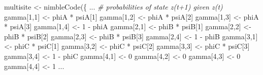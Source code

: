 \documentclass[
  12pt,
]{krantz}
\newenvironment{Shaded}{\begin{snugshade}}{\end{snugshade}}
\newcommand{\CommentTok}[1]{\textcolor[rgb]{0.56,0.35,0.01}{\textit{#1}}}
\newcommand{\DecValTok}[1]{\textcolor[rgb]{0.00,0.00,0.81}{#1}}
\newcommand{\FunctionTok}[1]{\textcolor[rgb]{0.00,0.00,0.00}{#1}}
\newcommand{\NormalTok}[1]{#1}
\newcommand{\OtherTok}[1]{\textcolor[rgb]{0.56,0.35,0.01}{#1}}
\newcommand{\SpecialCharTok}[1]{\textcolor[rgb]{0.00,0.00,0.00}{#1}}
\begin{document}
\begin{Shaded}
\begin{Highlighting}[]
\NormalTok{multisite }\OtherTok{\textless{}{-}} \FunctionTok{nimbleCode}\NormalTok{(\{}
\NormalTok{...}
  \CommentTok{\# probabilities of state z(t+1) given z(t)}
\NormalTok{  gamma[}\DecValTok{1}\NormalTok{,}\DecValTok{1}\NormalTok{] }\OtherTok{\textless{}{-}}\NormalTok{ phiA }\SpecialCharTok{*}\NormalTok{ psiA[}\DecValTok{1}\NormalTok{]}
\NormalTok{  gamma[}\DecValTok{1}\NormalTok{,}\DecValTok{2}\NormalTok{] }\OtherTok{\textless{}{-}}\NormalTok{ phiA }\SpecialCharTok{*}\NormalTok{ psiA[}\DecValTok{2}\NormalTok{]}
\NormalTok{  gamma[}\DecValTok{1}\NormalTok{,}\DecValTok{3}\NormalTok{] }\OtherTok{\textless{}{-}}\NormalTok{ phiA }\SpecialCharTok{*}\NormalTok{ psiA[}\DecValTok{3}\NormalTok{]}
\NormalTok{  gamma[}\DecValTok{1}\NormalTok{,}\DecValTok{4}\NormalTok{] }\OtherTok{\textless{}{-}} \DecValTok{1} \SpecialCharTok{{-}}\NormalTok{ phiA}
\NormalTok{  gamma[}\DecValTok{2}\NormalTok{,}\DecValTok{1}\NormalTok{] }\OtherTok{\textless{}{-}}\NormalTok{ phiB }\SpecialCharTok{*}\NormalTok{ psiB[}\DecValTok{1}\NormalTok{]}
\NormalTok{  gamma[}\DecValTok{2}\NormalTok{,}\DecValTok{2}\NormalTok{] }\OtherTok{\textless{}{-}}\NormalTok{ phiB }\SpecialCharTok{*}\NormalTok{ psiB[}\DecValTok{2}\NormalTok{]}
\NormalTok{  gamma[}\DecValTok{2}\NormalTok{,}\DecValTok{3}\NormalTok{] }\OtherTok{\textless{}{-}}\NormalTok{ phiB }\SpecialCharTok{*}\NormalTok{ psiB[}\DecValTok{3}\NormalTok{]}
\NormalTok{  gamma[}\DecValTok{2}\NormalTok{,}\DecValTok{4}\NormalTok{] }\OtherTok{\textless{}{-}} \DecValTok{1} \SpecialCharTok{{-}}\NormalTok{ phiB}
\NormalTok{  gamma[}\DecValTok{3}\NormalTok{,}\DecValTok{1}\NormalTok{] }\OtherTok{\textless{}{-}}\NormalTok{ phiC }\SpecialCharTok{*}\NormalTok{ psiC[}\DecValTok{1}\NormalTok{]}
\NormalTok{  gamma[}\DecValTok{3}\NormalTok{,}\DecValTok{2}\NormalTok{] }\OtherTok{\textless{}{-}}\NormalTok{ phiC }\SpecialCharTok{*}\NormalTok{ psiC[}\DecValTok{2}\NormalTok{]}
\NormalTok{  gamma[}\DecValTok{3}\NormalTok{,}\DecValTok{3}\NormalTok{] }\OtherTok{\textless{}{-}}\NormalTok{ phiC }\SpecialCharTok{*}\NormalTok{ psiC[}\DecValTok{3}\NormalTok{]}
\NormalTok{  gamma[}\DecValTok{3}\NormalTok{,}\DecValTok{4}\NormalTok{] }\OtherTok{\textless{}{-}} \DecValTok{1} \SpecialCharTok{{-}}\NormalTok{ phiC}
\NormalTok{  gamma[}\DecValTok{4}\NormalTok{,}\DecValTok{1}\NormalTok{] }\OtherTok{\textless{}{-}} \DecValTok{0}
\NormalTok{  gamma[}\DecValTok{4}\NormalTok{,}\DecValTok{2}\NormalTok{] }\OtherTok{\textless{}{-}} \DecValTok{0}
\NormalTok{  gamma[}\DecValTok{4}\NormalTok{,}\DecValTok{3}\NormalTok{] }\OtherTok{\textless{}{-}} \DecValTok{0}
\NormalTok{  gamma[}\DecValTok{4}\NormalTok{,}\DecValTok{4}\NormalTok{] }\OtherTok{\textless{}{-}} \DecValTok{1}
\NormalTok{...}
\end{Highlighting}
\end{Shaded}
\end{document}
